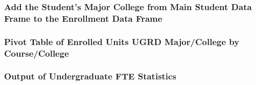 \documentclass[]{article}
\newenvironment{Shaded}{\begin{snugshade}}{\end{snugshade}}
\newcommand{\KeywordTok}[1]{\textcolor[rgb]{0.13,0.29,0.53}{\textbf{#1}}}
\newcommand{\DataTypeTok}[1]{\textcolor[rgb]{0.13,0.29,0.53}{#1}}
\newcommand{\DecValTok}[1]{\textcolor[rgb]{0.00,0.00,0.81}{#1}}
\newcommand{\StringTok}[1]{\textcolor[rgb]{0.31,0.60,0.02}{#1}}
\newcommand{\OperatorTok}[1]{\textcolor[rgb]{0.81,0.36,0.00}{\textbf{#1}}}
\newcommand{\NormalTok}[1]{#1}
\begin{document}
\subsubsection{Add the Student's Major College from Main Student Data
Frame to the Enrollment Data
Frame}\label{add-the-students-major-college-from-main-student-data-frame-to-the-enrollment-data-frame}

\begin{Shaded}
\end{Shaded}

\subsubsection{Pivot Table of Enrolled Units UGRD Major/College by
Course/College}\label{pivot-table-of-enrolled-units-ugrd-majorcollege-by-coursecollege}

\begin{Shaded}
\end{Shaded}

\subsubsection{Output of Undergraduate FTE
Statistics}\label{output-of-undergraduate-fte-statistics}

\begin{Shaded}
\end{Shaded}
\end{document}
